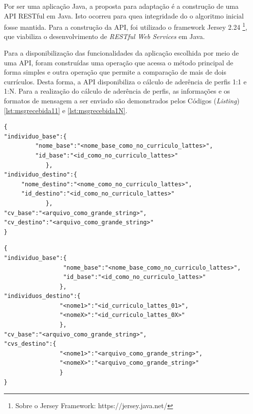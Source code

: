 Por ser uma aplicação Java, a proposta para adaptação é a construção de uma API RESTful em Java. Isto ocorreu para quea integridade do o algoritmo inicial fosse mantida. Para a construção da API, foi utilizado o framework Jersey 2.24 \footnote{Sobre o Jersey Framework: https://jersey.java.net/}, que viabiliza o desenvolvimento de \textit{RESTful Web Services} em Java.

Para a disponibilização das funcionalidades da aplicação escolhida por meio de uma API, foram construídas uma operação que acessa o método principal de forma simples e outra operação que permite a comparação de mais de dois currículos. Desta forma, a API disponibiliza o cálculo de aderência de perfis 1:1 e 1:N. Para a realização do cálculo de aderência de perfis, as informações e os formatos de mensagem a ser enviado são demonstrados pelos Códigos (\textit{Listing}) \ref{lst:msgrecebida11} e \ref{lst:msgrecebida1N}.



\begin{lstlisting}[caption={Formato de mensagem recebido pela API (1:1).},label={lst:msgrecebida11}]
{
"individuo_base":{
         "nome_base":"<nome_base_como_no_curriculo_lattes>",
         "id_base":"<id_como_no_curriculo_lattes>"
            },
"individuo_destino":{
     "nome_destino":"<nome_como_no_curriculo_lattes>",
     "id_destino":"<id_como_no_curriculo_lattes>"
            },
"cv_base":"<arquivo_como_grande_string>",
"cv_destino":"<arquivo_como_grande_string>"
}
\end{lstlisting}



\begin{lstlisting}[caption={Formato de mensagem recebido pela API (1:N).},label={lst:msgrecebida1N}]
{
"individuo_base":{
	        	 "nome_base":"<nome_base_como_no_curriculo_lattes>",
    		     "id_base":"<id_como_no_curriculo_lattes>"
	            },
"individuos_destino":{
				"<nome1>":"<id_curriculo_lattes_01>",
				"<nomeX>":"<id_curriculo_lattes_0X>"
				},
"cv_base":"<arquivo_como_grande_string>",
"cvs_destino":{
				"<nome1>":"<arquivo_como_grande_string>",
				"<nomeX>":"<arquivo_como_grande_string>"
				}
}
\end{lstlisting}

